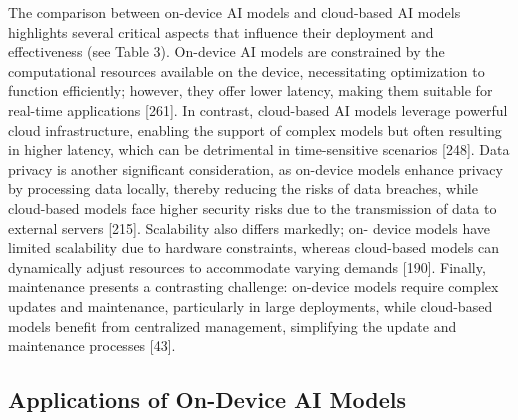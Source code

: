 The comparison between on-device AI models and cloud-based AI models highlights several critical aspects that influence their deployment and effectiveness (see Table 3). On-device AI models are constrained by the computational resources available on the device, necessitating optimization to function efficiently; however, they offer lower latency, making them suitable for real-time applications [261]. In contrast, cloud-based AI models leverage powerful cloud infrastructure, enabling the support of complex models but often resulting in higher latency, which can be detrimental in time-sensitive scenarios [248]. Data privacy is another significant consideration, as on-device models enhance privacy by processing data locally, thereby reducing the risks of data breaches, while cloud-based models face higher security risks due to the transmission of data to external servers [215]. Scalability also differs markedly; on- device models have limited scalability due to hardware constraints, whereas cloud-based models can dynamically adjust resources to accommodate varying demands [190]. Finally, maintenance presents a contrasting challenge: on-device models require complex updates and maintenance, particularly in large deployments, while cloud-based models benefit from centralized management, simplifying the update and maintenance processes [43].

\subsection{Applications of On-Device AI Models}

